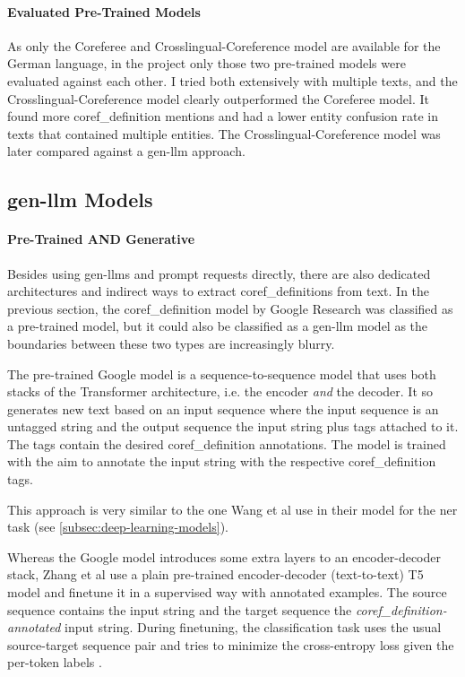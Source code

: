 \paragraph{Evaluated Pre-Trained Models}
As only the Coreferee \cite{Coreferee} and Crosslingual-Coreference model \cite{xxCoref} are available for the German language, in the project only those two pre-trained models were evaluated against each other.
I tried both extensively with multiple texts, and the Crosslingual-Coreference model \cite{xxCoref} clearly outperformed the Coreferee \cite{Coreferee} model.
It found more \gls{coref_definition} mentions and had a lower entity confusion rate in texts that contained multiple entities.
The Crosslingual-Coreference model \cite{xxCoref} was later compared against a \gls{gen-llm} approach.

\subsection{\gls{gen-llm} Models}\label{subsec:generative-llm-models}
\paragraph{Pre-Trained AND Generative}\label{par:pretrained-and-gen-llm}
Besides using \glspl{gen-llm} and \gls{prompt} requests directly, there are also dedicated architectures and indirect ways to extract \glspl{coref_definition} from text.
In the previous section, the \gls{coref_definition} model by Google Research \cite{CorefSeq2Seq} was classified as a pre-trained model, but it could also be classified as a \gls{gen-llm} model as the boundaries between these two types are increasingly blurry.

The pre-trained Google model \cite{CorefSeq2Seq} is a sequence-to-sequence model that uses both stacks of the \gls{Transformer} architecture, i.e. the encoder \emph{and} the decoder.
It so generates new text based on an input sequence where the input sequence is an untagged string and the output sequence the input string plus tags attached to it.
The tags contain the desired \gls{coref_definition} annotations.
The model is trained with the aim to annotate the input string with the respective \gls{coref_definition} tags.

This approach is very similar to the one Wang et al \cite{gptner} use in their model for the \gls{ner} task (see \ref{subsec:deep-learning-models}).

Whereas the Google \cite{CorefSeq2Seq} model introduces some extra layers to an encoder-decoder stack, Zhang et al \cite{zhangcorefseq2seq} use a plain pre-trained encoder-decoder (text-to-text) T5 model \cite{googlet5} and finetune it in a supervised way with annotated examples.
The source sequence contains the input string and the target sequence the \emph{\gls{coref_definition}-annotated} input string.
During finetuning, the classification task uses the usual source-target sequence pair and tries to minimize the cross-entropy loss given the per-\gls{token} labels \cite{zhangcorefseq2seq}.
